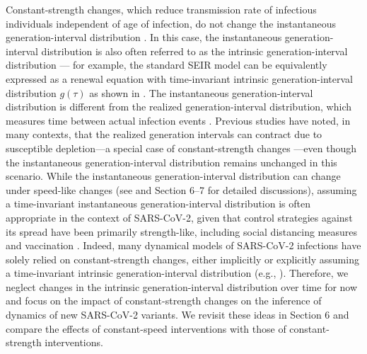 \documentclass[12pt]{article}
\begin{document}
Constant-strength changes, which reduce transmission rate of infectious individuals independent of age of infection, do not change the instantaneous generation-interval distribution \citep{fraser2007estimating}.
In this case, the instantaneous generation-interval distribution is also often referred to as the intrinsic generation-interval distribution \citep{champredon2015intrinsic,champredon2018two,gostic2020practical,park2020time}---
for example, the standard SEIR model can be equivalently expressed as a renewal equation with time-invariant intrinsic generation-interval distribution $g(\tau)$ as shown in \citep{champredon2018equivalence}.
The instantaneous generation-interval distribution is different from the realized generation-interval distribution, which measures time between actual infection events \citep{champredon2015intrinsic}.
Previous studies have noted, in many contexts, that the realized generation intervals can contract due to susceptible depletion---a special case of constant-strength changes \citep{kenah2008generation,nishiura2010time,champredon2015intrinsic}---even though the instantaneous generation-interval distribution remains unchanged in this scenario.
While the instantaneous generation-interval distribution can change under speed-like changes (see \cite{fraser2007estimating} and Section 6--7 for detailed discussions), assuming a time-invariant instantaneous generation-interval distribution is often appropriate in the context of SARS-CoV-2, given that control strategies against its spread have been primarily strength-like, including social distancing measures \citep{flaxman2020Rt} and vaccination \citep{moore2021vaccination}.
Indeed, many dynamical models of SARS-CoV-2 infections have solely relied on constant-strength changes, either implicitly or explicitly assuming a time-invariant intrinsic generation-interval distribution (e.g., \citep{flaxman2020Rt,gostic2020practical,brauner2021inferring}).
Therefore, we neglect changes in the intrinsic generation-interval distribution over time for now and focus on the impact of constant-strength changes on the inference of dynamics of new SARS-CoV-2 variants.
We revisit these ideas in Section 6 and compare the effects of constant-speed interventions with those of constant-strength interventions.
\end{document}
